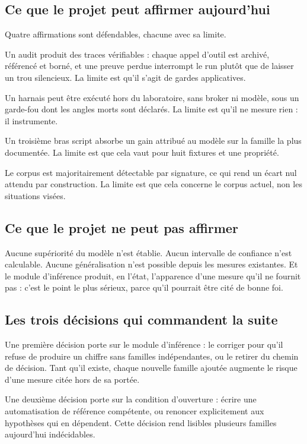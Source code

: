 \subsection{Ce que le projet peut affirmer aujourd'hui}

Quatre affirmations sont défendables, chacune avec sa limite.

Un audit produit des traces vérifiables : chaque appel d'outil est archivé,
référencé et borné, et une preuve perdue interrompt le run plutôt que de
laisser un trou silencieux. La limite est qu'il s'agit de gardes applicatives.

Un harnais peut être exécuté hors du laboratoire, sans broker ni modèle, sous un
garde-fou dont les angles morts sont déclarés. La limite est qu'il ne mesure
rien : il instrumente.

Un troisième bras script absorbe un gain attribué au modèle sur la famille la
plus documentée. La limite est que cela vaut pour huit fixtures et une propriété.

Le corpus est majoritairement détectable par signature, ce qui rend un écart nul
attendu par construction. La limite est que cela concerne le corpus actuel, non
les situations visées.

\subsection{Ce que le projet ne peut pas affirmer}

Aucune supériorité du modèle n'est établie. Aucun intervalle de confiance n'est
calculable. Aucune généralisation n'est possible depuis les mesures existantes.
Et le module d'inférence produit, en l'état, l'apparence d'une mesure qu'il ne
fournit pas : c'est le point le plus sérieux, parce qu'il pourrait être cité de
bonne foi.

\subsection{Les trois décisions qui commandent la suite}

Une première décision porte sur le module d'inférence : le corriger pour qu'il
refuse de produire un chiffre sans familles indépendantes, ou le retirer du
chemin de décision. Tant qu'il existe, chaque nouvelle famille ajoutée augmente
le risque d'une mesure citée hors de sa portée.

Une deuxième décision porte sur la condition d'ouverture : écrire une
automatisation de référence compétente, ou renoncer explicitement aux hypothèses
qui en dépendent. Cette décision rend lisibles plusieurs familles aujourd'hui
indécidables.

